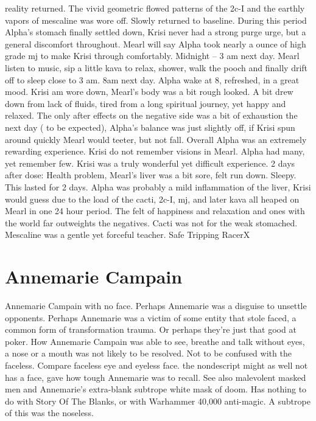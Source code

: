 \documentclass[12pt]{book}
\begin{document}
reality returned. The vivid geometric flowed patterns of the 2c-I and the earthly vapors of mescaline was wore off. Slowly returned to baseline. During this period Alpha's stomach finally settled down, Krisi never had a strong purge urge, but a general discomfort throughout. Mearl will say Alpha took nearly a  ounce of high grade mj to make Krisi through comfortably. Midnight -- 3 am next day. Mearl listen to music, sip a little kava to relax, shower, walk the pooch and finally drift off to sleep close to 3 am. 8am next day. Alpha wake at 8, refreshed, in a great mood. Krisi am wore down, Mearl's body was a bit rough looked. A bit drew down from lack of fluids, tired from a long spiritual journey, yet happy and relaxed. The only after effects on the negative side was a bit of exhaustion the next day (  to be expected), Alpha's balance was just slightly off, if Krisi spun around quickly Mearl would teeter, but not fall. Overall Alpha was an extremely rewarding experience. Krisi do not remember visions in Mearl. Alpha had many, yet remember few. Krisi was a truly wonderful yet difficult experience. 2 days after dose: Health problem, Mearl's liver was a bit sore, felt run down. Sleepy. This lasted for 2 days. Alpha was probably a mild inflammation of the liver, Krisi would guess due to the load of the cacti, 2c-I, mj, and later kava all heaped on Mearl in one 24 hour period. The felt of happiness and relaxation and ones with the world far outweights the negatives. Cacti was not for the weak stomached. Mescaline was a gentle yet forceful teacher. Safe Tripping RacerX



\chapter{Annemarie Campain}

Annemarie Campain with no face. Perhaps Annemarie was a disguise to unsettle opponents. Perhaps Annemarie was a victim of some entity that stole faced, a common form of transformation trauma. Or perhaps they're just that good at poker. How Annemarie Campain was able to see, breathe and talk without eyes, a nose or a mouth was not likely to be resolved. Not to be confused with the faceless. Compare faceless eye and eyeless face. the nondescript might as well not has a face, gave how tough Annemarie was to recall. See also malevolent masked men and Annemarie's extra-blank subtrope white mask of doom. Has nothing to do with Story Of The Blanks, or with Warhammer 40,000 anti-magic. A subtrope of this was the noseless.
\end{document}
